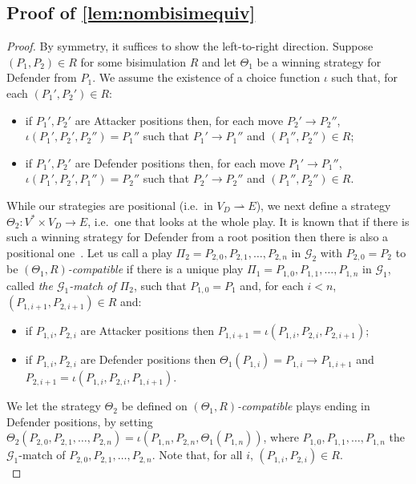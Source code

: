 \documentclass[10pt,a4paper]{article}
\theoremstyle{definition}
\theoremstyle{remark}
\newcommand\Gcal{\mathcal{G}}
\begin{document}
\subsection{Proof of \cref{lem:nombisimequiv}}
\nombisimequiv*
\begin{proof}
  By symmetry, it suffices to show the left-to-right direction. Suppose $(P_1,P_2)\in R$ for some bisimulation $R$ and let $\Theta_1$ be a winning strategy for Defender from $P_1$. We assume the existence of a choice function $\iota$ such that, for each $(P_1',P_2')\in R$:
  \begin{itemize}
\item    if $P_1',P_2'$ are Attacker positions then, for each move $P_2'\to P_2''$, $\iota(P_1',P_2',P_2'')=P_1''$ such that $P_1'\to P_1''$ and $(P_1'',P_2'')\in R$; 
\item    if $P_1',P_2'$ are Defender positions then, for each move $P_1'\to P_1''$, $\iota(P_1',P_2',P_1'')=P_2''$ such that $P_2'\to P_2''$ and $(P_1'',P_2'')\in R$.
    \end{itemize}
While our strategies are positional (i.e.\ in $V_D\rightharpoonup E$), we next define a strategy $\Theta_2:V^*\times V_D\to E$, i.e.\ one that looks at the whole play. It is known that if there is such a winning strategy for Defender from a root position then there is also a positional one~\cite{EmersonJutla91}. Let us call a play $\Pi_2=P_{2,0},P_{2,1},\dots,P_{2,n}$ in $\Gcal_2$ with $P_{2,0}=P_2$ to be \emph{$(\Theta_1,R)$-compatible} if there is a unique play 
$\Pi_1=P_{1,0},P_{1,1},\dots,P_{1,n}$ in $\Gcal_1$, called \emph{the $\Gcal_1$-match of $\Pi_2$}, such that $P_{1,0}=P_1$ and, for each $i<n$, $(P_{1,i+1},P_{2,i+1})\in R$ and:
\begin{itemize}
\item if $P_{1,i},P_{2,i}$ are Attacker positions then $P_{1,i+1}=\iota(P_{1,i},P_{2,i},P_{2,i+1})$;
\item if $P_{1,i},P_{2,i}$ are Defender positions then $\Theta_1(P_{1,i})=P_{1,i}\to P_{1,i+1}$ and $P_{2,i+1}=\iota(P_{1,i},P_{2,i},P_{1,i+1})$.
\end{itemize}
We let the strategy $\Theta_2$ be defined on \emph{$(\Theta_1,R)$-compatible} plays ending in Defender positions, by setting
$\Theta_2(P_{2,0},P_{2,1},\dots,P_{2,n})=\iota(P_{1,n},P_{2,n},\Theta_1(P_{1,n}))$, where $P_{1,0},P_{1,1},\dots,P_{1,n}$ the $\Gcal_1$-match of $P_{2,0},P_{2,1},\dots,P_{2,n}$. Note that, for all $i$, $(P_{1,i},P_{2,i})\in R$.
\\

\end{proof}
\end{document}
